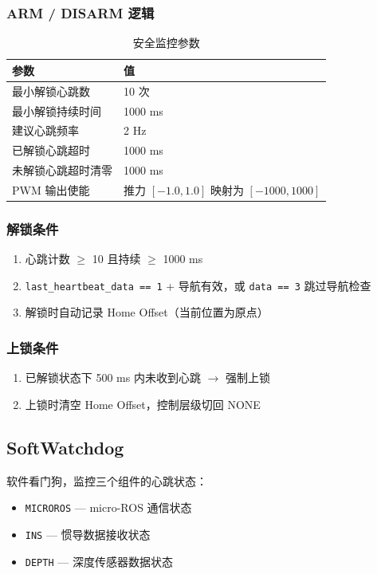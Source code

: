 \documentclass[12pt,a4paper]{article}
\begin{document}
\subsubsection{ARM / DISARM 逻辑}

\begin{table}[H]
\centering
\begin{tabularx}{\textwidth}{lX}
\toprule
\textbf{参数} & \textbf{值} \\
\midrule
最小解锁心跳数 & 10 次 \\
最小解锁持续时间 & 1000 ms \\
建议心跳频率 & 2 Hz \\
已解锁心跳超时 & 1000 ms \\
未解锁心跳超时清零 & 1000 ms \\
PWM 输出使能 & 推力 $[-1.0, 1.0]$ 映射为 $[-1000, 1000]$ \\
\bottomrule
\end{tabularx}
\caption{安全监控参数}
\end{table}

\subsubsection{解锁条件}
\begin{enumerate}
    \item 心跳计数 $\geq$ 10 且持续 $\geq$ 1000 ms
    \item \texttt{last\_heartbeat\_data == 1} + 导航有效，或 \texttt{data == 3} 跳过导航检查
    \item 解锁时自动记录 Home Offset（当前位置为原点）
\end{enumerate}

\subsubsection{上锁条件}
\begin{enumerate}
    \item 已解锁状态下 500 ms 内未收到心跳 $\rightarrow$ 强制上锁
    \item 上锁时清空 Home Offset，控制层级切回 NONE
\end{enumerate}

\subsection{SoftWatchdog}

软件看门狗，监控三个组件的心跳状态：

\begin{itemize}
    \item \texttt{MICROROS} — micro-ROS 通信状态
    \item \texttt{INS} — 惯导数据接收状态
    \item \texttt{DEPTH} — 深度传感器数据状态
\end{itemize}
\end{document}
